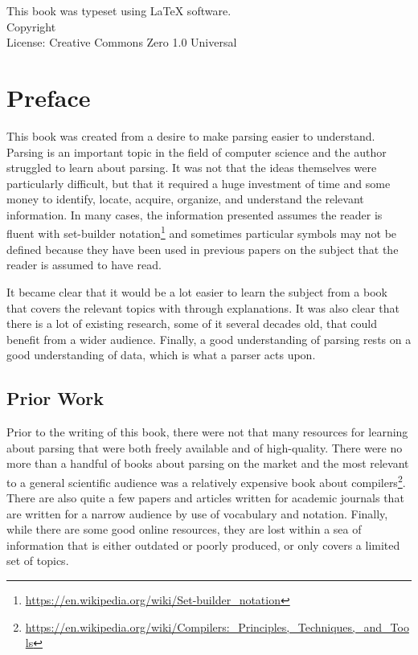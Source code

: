 \documentclass{book}
\makeatletter
\newcommand{\booklicense}{Creative Commons Zero 1.0 Universal}
\newcommand{\bookauthor}{\@author}
\makeatother
\begin{document}
\thispagestyle{empty}

\begin{flushleft}
\vspace*{\fill}
This book was typeset using \LaTeX{} software.\\
\vspace{\fill}
Copyright \textcopyright{} \the\year{}  \bookauthor\\
License: \booklicense
\end{flushleft}

\addtocounter{page}{2}

\chapter*{Preface}
This book was created from a desire to make parsing easier to understand.
Parsing is an important topic in the field of computer science and the author
struggled to learn about parsing. It was not that the ideas themselves were
particularly difficult, but that it required a huge investment of time and some
money to identify, locate, acquire, organize, and understand the relevant
information. In many cases, the information presented assumes the reader
is fluent with set-builder notation\footnote{\url{https://en.wikipedia.org/wiki/Set-builder_notation}}
and sometimes particular symbols may not be defined because they have been
used in previous papers on the subject that the reader is assumed to
have read.

It became clear that it would be a lot easier to learn the subject from a
book that covers the relevant topics with through explanations. It was
also clear that there is a lot of existing research, some
of it several decades old, that could benefit from a wider audience.
Finally, a good understanding of parsing rests on a good
understanding of data, which is what a parser acts upon.

\section*{Prior Work}
Prior to the writing of this book, there were not that many resources for
learning about parsing that were both freely available and of high-quality.
There were no more than a handful of books about parsing on the market and
the most relevant to a general scientific audience was a relatively expensive
book about 
compilers\footnote{\url{https://en.wikipedia.org/wiki/Compilers:_Principles,_Techniques,_and_Tools}}.
There are also quite a few papers and articles written for academic
journals that are written for a narrow audience by use of vocabulary and notation.
Finally, while there are some good online resources, they are lost within a sea
of information that is either outdated or poorly produced, or only covers a
limited set of topics. 
\end{document}
